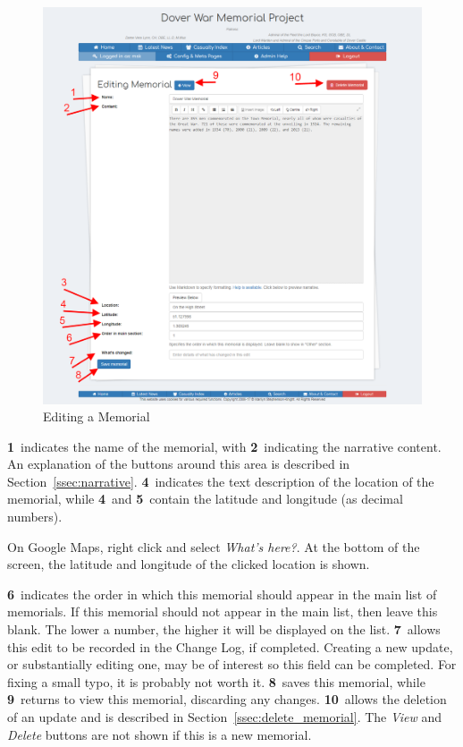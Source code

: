 \documentclass[12pt]{article}
\newcommand{\marker}[1]{\color{red}\textbf{#1}\color{black}}
\begin{document}
\begin{figure}[h]
  \centering
 \includegraphics[width=.9\textwidth]{pics/edit_memorial.png}
	\caption{Editing a Memorial}\label{fig:edit_memorial}
\end{figure}

\marker{1}\ indicates the name of the memorial, with \marker{2}\ indicating the narrative content. An explanation of the buttons around this area is described in Section~\ref{ssec:narrative}. \marker{4}\ indicates the text description of the location of the memorial, while \marker{4}\ and \marker{5}\ contain the latitude and longitude (as decimal numbers). 

\begin{infoBox}
On Google Maps, right click and select \textit{What's here?}. At the bottom of the screen, the latitude and longitude of the clicked location is shown.
\end{infoBox}

\marker{6}\ indicates the order in which this memorial should appear in the main list of memorials. If this memorial should not appear in the main list, then leave this blank. The lower a number, the higher it will be displayed on the list. \marker{7}\ allows this edit to be recorded in the Change Log, if completed. Creating a new update, or substantially editing one, may be of interest so this field can be completed. For fixing a small typo, it is probably not worth it. \marker{8}\ saves this memorial, while \marker{9}\ returns to view this memorial, discarding any changes. \marker{10}\ allows the deletion of an update and is described in Section~\ref{ssec:delete_memorial}. The \textit{View} and \textit{Delete} buttons are not shown if this is a new memorial.
\end{document}
